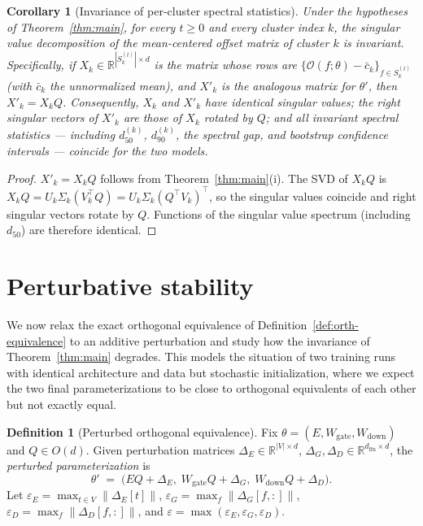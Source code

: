 \documentclass[11pt,letterpaper]{article}
\newtheorem{corollary}[theorem]{Corollary}
\theoremstyle{definition}
\newtheorem{definition}[theorem]{Definition}
\begin{document}
\begin{corollary}[Invariance of per-cluster spectral statistics]
\label{cor:svd}
Under the hypotheses of Theorem~\ref{thm:main}, for every $t \geq 0$ and every cluster index $k$, the singular value decomposition of the mean-centered offset matrix of cluster $k$ is invariant. Specifically, if $X_k \in \mathbb{R}^{|S_k^{(t)}| \times d}$ is the matrix whose rows are $\{\mathcal{O}(f; \theta) - \bar{c}_k\}_{f \in S_k^{(t)}}$ (with $\bar{c}_k$ the unnormalized mean), and $X'_k$ is the analogous matrix for $\theta'$, then $X'_k = X_k Q$. Consequently, $X_k$ and $X'_k$ have identical singular values; the right singular vectors of $X'_k$ are those of $X_k$ rotated by $Q$; and all invariant spectral statistics --- including $d_{50}^{(k)}$, $d_{90}^{(k)}$, the spectral gap, and bootstrap confidence intervals --- coincide for the two models.
\end{corollary}

\begin{proof}
$X'_k = X_k Q$ follows from Theorem~\ref{thm:main}(i). The SVD of $X_k Q$ is $X_k Q = U_k \Sigma_k (V_k^\top Q) = U_k \Sigma_k (Q^\top V_k)^\top$, so the singular values coincide and right singular vectors rotate by $Q$. Functions of the singular value spectrum (including $d_{50}$) are therefore identical.
\end{proof}

\section{Perturbative stability}

We now relax the exact orthogonal equivalence of Definition~\ref{def:orth-equivalence} to an additive perturbation and study how the invariance of Theorem~\ref{thm:main} degrades. This models the situation of two training runs with identical architecture and data but stochastic initialization, where we expect the two final parameterizations to be close to orthogonal equivalents of each other but not exactly equal.

\begin{definition}[Perturbed orthogonal equivalence]
\label{def:perturbation}
Fix $\theta = (E, W_{\mathrm{gate}}, W_{\mathrm{down}})$ and $Q \in O(d)$. Given perturbation matrices $\Delta_E \in \mathbb{R}^{|V| \times d}$, $\Delta_G, \Delta_D \in \mathbb{R}^{d_{\mathrm{ffn}} \times d}$, the \emph{perturbed parameterization} is
\[
\theta' \;=\; \big( EQ + \Delta_E, \; W_{\mathrm{gate}} Q + \Delta_G, \; W_{\mathrm{down}} Q + \Delta_D \big).
\]
Let $\varepsilon_E = \max_{t \in V} \| \Delta_E[t] \|$, $\varepsilon_G = \max_{f} \| \Delta_G[f, :] \|$, $\varepsilon_D = \max_{f} \| \Delta_D[f, :] \|$, and $\varepsilon = \max(\varepsilon_E, \varepsilon_G, \varepsilon_D)$.
\end{definition}
\end{document}
